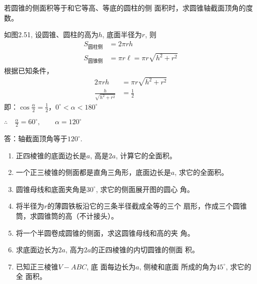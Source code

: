\begin{example}
    若圆锥的侧面积等于和它等高、等底的圆柱的侧
面积时，求圆锥轴截面顶角的度数。
\end{example}

\begin{figure}[htp]
    \centering
{}
    \caption{}
\end{figure}

\begin{solution}
    如图2.51, 设圆锥、圆柱的高为$h$, 底面半径为$r$, 则
\[\begin{split}
    S_{\text{圆柱侧}}&=2\pi rh\\
S_{\text{圆锥侧}} &=\pi r\ell=\pi r\sqrt{h^2+r^2}
\end{split}\]
根据已知条件，
\[\begin{split}
    2\pi rh&=\pi r\sqrt{h^2+r^2}\\
\frac{h}{\sqrt{h^2+r^2}}&=\frac{1}{2}
\end{split}\]
即：$\cos\frac{\alpha}{2}=\frac{1}{2}$，$0^{\circ}<\alpha<180^{\circ}$

$\therefore\quad \frac{\alpha}{2}=60^{\circ},\qquad \alpha=120^{\circ}$

答：轴截面顶角等于$120^{\circ}$.
\end{solution}

\begin{ex}
\begin{enumerate}
    \item 正四棱锥的底面边长是$a$, 高是$2a$, 计算它的全面积。
    \item 一个正三棱锥的侧面都是直角三角形，底面边长是$a$, 
    求它的全面积。
    \item 圆锥母线和底面夹角是$30^{\circ}$, 求它的侧面展开图的圆心
    角。
    \item 将半径为$r$的薄圆铁板沿它的三条半径截成全等的三个
    扇形，作成三个圆锥筒，求圆锥筒的高（不计接头）。
    \item 
    将一个半圆卷成圆锥的侧面，求这圆锥母线和高的夹
    角。
    \item 求底面边长为$2a$, 高为$2a$的正四棱锥的内切圆锥的侧面
    积。
    \item 已知正三棱锥$V-ABC$, 底
    面每边长为$a$, 侧棱和底面
    所成的角为$45^{\circ}$, 求它的全
    面积。
\end{enumerate}
\end{ex}

